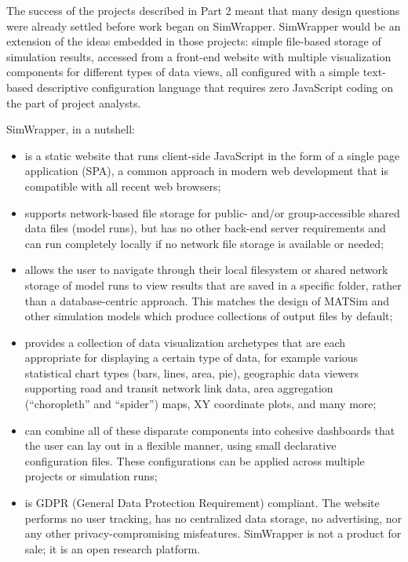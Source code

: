 The success of the projects described in Part 2 meant that many design questions were already settled before work began on SimWrapper. SimWrapper would be an extension of the ideas embedded in those projects: simple file-based storage of simulation results, accessed from a front-end website with multiple visualization components for different types of data views, all configured with a simple text-based descriptive configuration language that requires zero JavaScript coding on the part of project analysts.

SimWrapper, in a nutshell:

\begin{itemize}
\item
    is a static website that runs client-side JavaScript in the form of
    a single page application (\gls{SPA}), a common approach in modern web
    development that is compatible with all recent web browsers;
\item
    supports network-based file storage for public- and/or
    group-accessible shared data files (model runs), but has no other
    back-end server requirements and can run completely locally if no
    network file storage is available or needed;
\item
    allows the user to navigate through their local filesystem or shared
    network storage of model runs to view results that are saved in a
    specific folder, rather than a database-centric approach. This
    matches the design of MATSim and other simulation models which
    produce collections of output files by default;
\item
    provides a collection of data visualization archetypes that are each
    appropriate for displaying a certain type of data, for example
    various statistical chart types (bars, lines, area, pie), geographic
    data viewers supporting road and transit network link data, area
    aggregation (``choropleth'' and ``spider'') maps, XY coordinate
    plots, and many more;
\item
    can combine all of these disparate components into cohesive
    dashboards that the user can lay out in a flexible manner, using
    small declarative configuration files. These configurations can be
    applied across multiple projects or simulation runs;
\item
    is GDPR (General Data Protection Requirement) compliant. The website performs
    no user tracking, has no centralized data storage,
    no advertising, nor any other privacy-compromising misfeatures.
    SimWrapper is not a product for sale; it is an open research platform.
\end{itemize}

